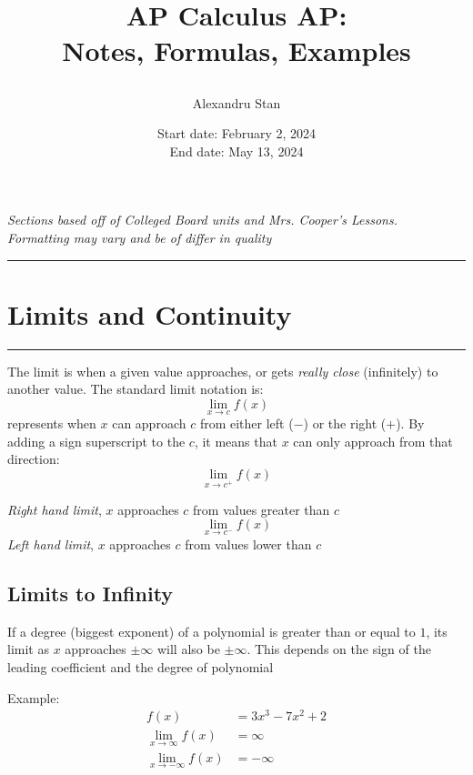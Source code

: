 \documentclass[12pt]{article}
\title{
    \textbf{AP Calculus AP:\\ Notes, Formulas, Examples}
    \author{Alexandru Stan}
    \date{Start date: February 2, 2024 \\ End date: May 13, 2024}
}
\newcommand{\fline}{\par\noindent\rule{\textwidth}{0.1pt}}
\newcommand{\uit}[1]{\textit{#1}}
\begin{document}
    \maketitle
    \vfill
    \begin{center}
        \uit{
            Sections based off of Colleged Board units and Mrs. Cooper's Lessons. \\
            Formatting may vary and be of differ in quality
        }
    \end{center}
    \newpage

    \tableofcontents
    \fline
    \newpage

    \section{Limits and Continuity}
    \fline

    The limit is when a given value approaches, or gets \textit{really close} (infinitely) to another value. 
    The standard limit notation is:
    \[
        \lim_{x \to c} f(x)    
    \]
    represents when $x$ can approach $c$ from either left ($-$) or the right ($+$). By adding
    a sign superscript to the $c$, it means that $x$ can only approach from that direction:
    \[
        \lim_{x \to c^+} f(x)    
    \]
    \begin{center}
        \uit{Right hand limit}, $x$ approaches $c$ from values greater than $c$
        \[
            \lim_{x \to c^-} f(x)    
        \]
        \uit{Left hand limit}, $x$ approaches $c$ from values lower than $c$
    \end{center}

    \subsection{Limits to Infinity}

    If a degree (biggest exponent) of a polynomial is greater than or equal to $1$, its
    limit as $x$ approaches $\pm\infty$ will also be $\pm\infty$. This depends on the sign of the leading
    coefficient and the degree of polynomial

    \noindent Example:
    \[
        \begin{aligned}
            f(x) &= 3x^3 - 7x^2 + 2 \\
            \lim_{x \to \infty} f(x) &= \infty \\
            \lim_{x \to -\infty} f(x) &= -\infty     
        \end{aligned}    
    \]
\end{document}
